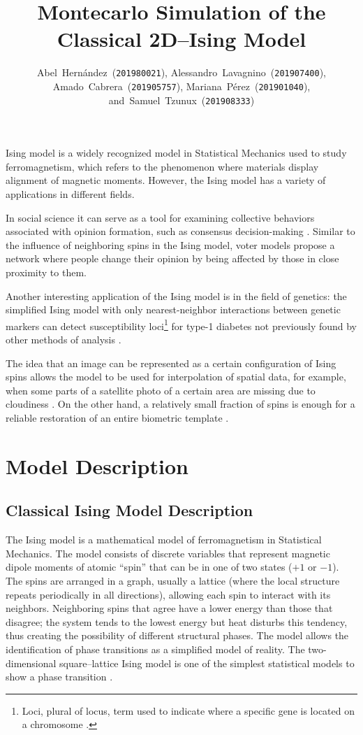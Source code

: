 \documentclass[
    10pt,
    journal,
    compsoc,
    english
]{IEEEtran}
\title{Montecarlo Simulation of the\\Classical 2D--Ising Model}
\author{Abel~Hernández~(\texttt{201980021}),
        Alessandro~Lavagnino~(\texttt{201907400}),
        Amado~Cabrera~(\texttt{201905757}),
        Mariana~Pérez~(\texttt{201901040}),
        and~Samuel~Tzunux~(\texttt{201908333})}
\begin{document}
\maketitle

 Ising model is a widely recognized model in Statistical Mechanics used to study ferromagnetism, which refers to the phenomenon where materials display alignment of magnetic moments. However, the Ising model has a variety of applications in different fields.

In social science it can serve as a tool for examining collective behaviors associated with opinion formation, such as consensus decision-making \cite{social}. Similar to the influence of neighboring spins in the Ising model, voter models propose a network where people change their opinion by being affected by those in close proximity to them.

Another interesting application of the Ising model is in the field of genetics: the simplified Ising model with only nearest-neighbor interactions between genetic markers can detect susceptibility loci\footnote{Loci, plural of locus, term used to indicate where a specific gene is located on a chromosome \cite{loci}.} for type-1 diabetes not previously found by other methods of analysis \cite{genetics}.

The idea that an image can be represented as a certain configuration of Ising spins allows the model to be used for interpolation of spatial data, for example, when some parts of a satellite photo of a certain area are missing due to cloudiness \cite{spatialint}. On the other hand, a relatively small fraction of spins is enough for a reliable restoration of an entire biometric template \cite{biometric}.


\section{Model Description}
\subsection{Classical Ising Model Description}
The Ising model is a mathematical model of ferromagnetism in Statistical Mechanics. The model consists of discrete variables that represent magnetic dipole moments of atomic ``spin'' that can be in one of two states ($+1$ or $-1$). The spins are arranged in a graph, usually a lattice (where the local structure repeats periodically in all directions), allowing each spin to interact with its neighbors. Neighboring spins that agree have a lower energy than those that disagree; the system tends to the lowest energy but heat disturbs this tendency, thus creating the possibility of different structural phases. The model allows the identification of phase transitions as a simplified model of reality. The two-dimensional square--lattice Ising model is one of the simplest statistical models to show a phase transition \cite{IsingModelEn}.
\end{document}
